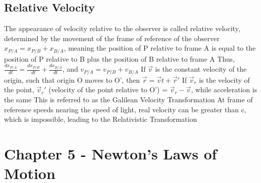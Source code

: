 \documentclass[11 pt, twoside]{article}
\newenvironment{outline*}
{
	\begin{outline}[enumerate]
	}
	{\end{outline}
}
\begin{document}
\subsection{Relative Velocity}
\begin{outline*}
\1 The appearance of velocity relative to the observer is called relative velocity, determined by the movement of the frame of reference of the observer
\2 $x_{P/A} = x_{P/B} + x_{B/A}$, meaning the position of P relative to frame A is equal to the position of P relative to B plus the position of B relative to frame A
\2 Thus, $\frac{dx_{P/A}}{dt} = \frac{dx_{P/B}}{dt} + \frac{dx_{B/A}}{dt}$, and $v_{P/A} = v_{P/B} + v_{B/A}$
\1 If  $\vec{v}$ is the constant velocity of the origin, such that origin O moves to O’, then $\vec{r} = \vec{v}t + \vec{r}'$ 
\2 If $\vec{v}_r$ is the velocity of the point, $\vec{v}_r'$ (velocity of the point relative to O’) = $\vec{v}_r - \vec{v}$, while acceleration is the same
\1 This is referred to as the Galilean Velocity Transformation
\2 At frame of reference speeds nearing the speed of light, real velocity can be greater than c, which is impossible, leading to the Relativistic Transformation
\end{outline*}
\section{Chapter 5 - Newton's Laws of Motion}
\end{document}
